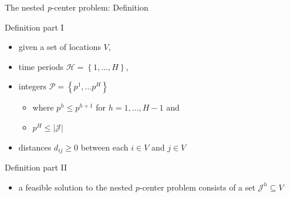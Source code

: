 \documentclass[utf8,aspectratio=169,ngerman,english]{beamer}
\begin{document}
\begin{frame}{The nested \textit{p}-center problem: Definition}
    \begin{minipage}{0.48\textwidth}
        \begin{block}{Definition part I}
            \vspace*{2pt}
            \begin{itemize}
                \item given a set of locations $V$, \pause
                \item time periods $\mathcal H = \left \{1,\dots,H \right \}$, \pause
                \item integers $\mathcal P = \left \{p^1, \dots p^H \right \}$   \pause
                      \begin{itemize}
                          \item where $p^h \leq p^{h+1}$ for $h = 1, \dots, H-1$ and
                          \item $p^H \leq \left\lvert \mathcal J \right\rvert$
                      \end{itemize} \pause
                \item distances $d_{ij} \geq 0$ between each $i \in V$ and $j \in V$ \pause
            \end{itemize}
            \vspace*{2pt}
        \end{block}
    \end{minipage}
    \begin{minipage}{0.48\textwidth}
        \begin{block}{Definition part II}
            \begin{itemize}
                \item a feasible solution to the nested $p$-center problem consists of a set $\mathcal J^h \subseteq V$ \pause

\end{itemize}
\end{block}
\end{minipage}
\end{frame}
\end{document}

